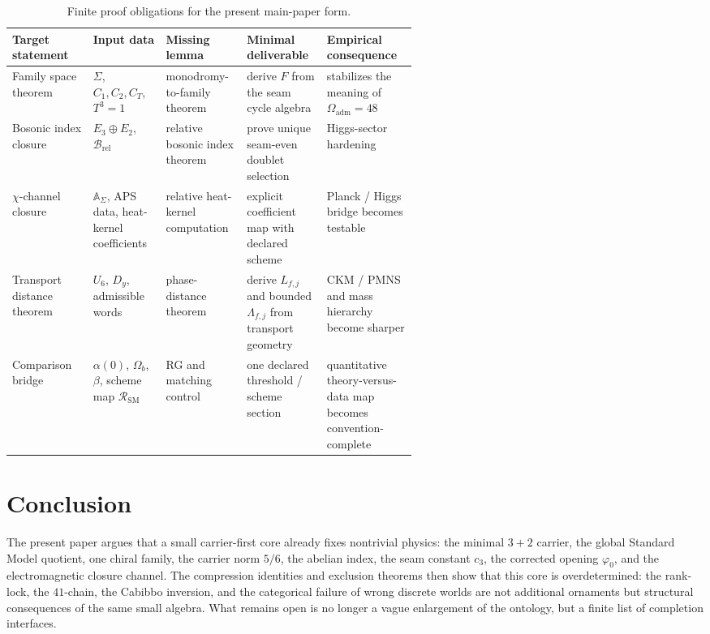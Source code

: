 \documentclass[11pt,a4paper]{article}
\theoremstyle{definition}
\theoremstyle{remark}
\newcommand{\Seam}{\Sigma}
\newcommand{\cthree}{c_3}
\newcommand{\phiz}{\varphi_0}
\newcommand{\SM}{\mathrm{SM}}
\newcommand{\Oadm}{\Omega_{\mathrm{adm}}}
\begin{document}
\begin{table}[t]
\centering
\small
\begin{tabularx}{\linewidth}{@{}>{\raggedright\arraybackslash}p{0.20\linewidth}>{\raggedright\arraybackslash}p{0.18\linewidth}>{\raggedright\arraybackslash}p{0.20\linewidth}YY@{}}
\toprule
Target statement & Input data & Missing lemma & Minimal deliverable & Empirical consequence \\
\midrule
Family space theorem & $\Seam$, $C_1,C_2,C_T$, $T^3=1$ & monodromy-to-family theorem & derive $F$ from the seam cycle algebra & stabilizes the meaning of $\Oadm=48$ \\
Bosonic index closure & $E_3\oplus E_2$, $\mathcal B_{\mathrm{rel}}$ & relative bosonic index theorem & prove unique seam-even doublet selection & Higgs-sector hardening \\
$\chi$-channel closure & $\mathbb A_{\Seam}$, APS data, heat-kernel coefficients & relative heat-kernel computation & explicit coefficient map with declared scheme & Planck / Higgs bridge becomes testable \\
Transport distance theorem & $U_6$, $D_y$, admissible words & phase-distance theorem & derive $L_{f,j}$ and bounded $\Lambda_{f,j}$ from transport geometry & CKM / PMNS and mass hierarchy become sharper \\
Comparison bridge & $\alpha(0)$, $\Omega_b$, $\beta$, scheme map $\mathcal R_{\SM}$ & RG and matching control & one declared threshold / scheme section & quantitative theory-versus-data map becomes convention-complete \\
\bottomrule
\end{tabularx}
\caption{Finite proof obligations for the present main-paper form.}
\label{tab:proof-obligations}
\end{table}

\section{Conclusion}

The present paper argues that a small carrier-first core already fixes nontrivial physics: the minimal $3+2$ carrier, the global Standard Model quotient, one chiral family, the carrier norm $5/6$, the abelian index, the seam constant $\cthree$, the corrected opening $\phiz$, and the electromagnetic closure channel. The compression identities and exclusion theorems then show that this core is overdetermined: the rank-lock, the $41$-chain, the Cabibbo inversion, and the categorical failure of wrong discrete worlds are not additional ornaments but structural consequences of the same small algebra. What remains open is no longer a vague enlargement of the ontology, but a finite list of completion interfaces.
\end{document}
